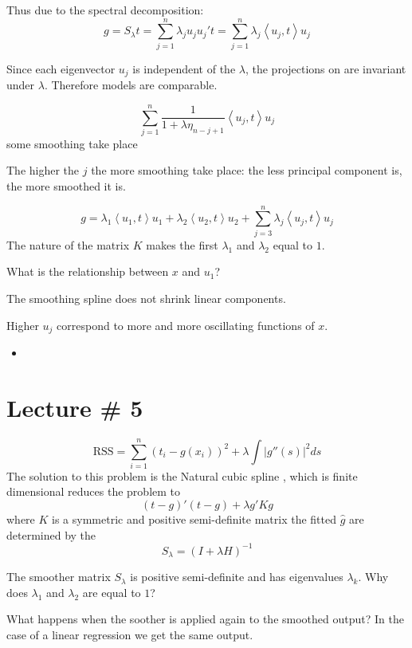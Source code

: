 \documentclass[a4paper]{article}
\newcommand{\brac}[1]{{\left ( #1 \right )}}
\newcommand{\abs}[1]{{\left | #1 \right |}}
\newcommand{\brkt}[1]{{\left\langle #1 \right\rangle}}
\newcommand{\RSS}{{\text{RSS}}}
\begin{document}
Thus due to the spectral decomposition:
\[g = S_\lambda t = \sum_{j=1}^n \lambda_j u_j u_j' t = \sum_{j=1}^n \lambda_j \brkt{u_j, t} u_j \]

Since each eigenvector $u_j$ is independent of the $\lambda$, the projections on are invariant under $\lambda$. Therefore models are comparable.

\[\sum_{j=1}^n \frac{1}{1+\lambda\eta_{n-j+1}} \brkt{u_j, t} u_j\]
some smoothing take place

The higher the $j$ the more smoothing take place:
	the less principal component is, the more smoothed it is.

\[g = \lambda_1\brkt{u_1, t} u_1 + \lambda_2\brkt{u_2, t} u_2 + \sum_{j=3}^n \lambda_j \brkt{u_j, t} u_j \]
The nature of the matrix $K$ makes the first $\lambda_1$ and $\lambda_2$ equal to $1$.

What is the relationship between $x$ and $u_1$?

The smoothing spline does not shrink linear components.

Higher $u_j$ correspond to more and more oscillating functions of $x$.




\begin{itemize}
	\item
\end{itemize}


\section{Lecture \# 5} %
\label{sec:lecture_5}

\[\RSS = \sum_{i=1}^n \brac{t_i - g(x_i)}^2 + \lambda \int \abs{g''(s)}^2ds\]
The solution to this problem is the Natural cubic spline , which is finite dimensional reduces the problem to
\[\brac{t-g}'\brac{t-g} + \lambda g'K g\]
where $K$ is a symmetric and positive  semi-definite matrix
the fitted $\hat{g}$ are determined by the 
\[S_\lambda = \brac{I+\lambda H}^{-1}\]

The smoother matrix $S_\lambda$ is positive semi-definite and has eigenvalues $\lambda_k$. Why does $\lambda_1$ and $\lambda_2$ are equal to $1$?


What happens when the soother is applied again to the smoothed output?
In the case of a linear regression we get the same output.
\end{document}

